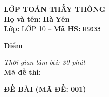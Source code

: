 \noindent
\begin{tcolorbox}[colback=white,colframe=black,arc=0mm,boxrule=0.8pt,top=4pt,bottom=4pt,left=6pt,right=6pt]
	\begin{minipage}[c]{0.44\textwidth}
		{\bfseries\large LỚP TOÁN THẦY THÔNG}\\[3pt]
		\textbf{Họ và tên:} \textbf{\large Hà Yên}\\[3pt]
		\textbf{Lớp:} LỚP 10 \quad -- \quad \textbf{Mã HS:} \texttt{HS033}
	\end{minipage}
	\hfill
	\begin{minipage}[c]{0.22\textwidth}
		\begin{tcolorbox}[colback=white,colframe=black,arc=0mm,boxrule=0.6pt,height=1.8cm,halign=center,valign=top,top=2pt]
			{\bfseries\normalsize Điểm}
		\end{tcolorbox}
	\end{minipage}
	\hfill
	\begin{minipage}[c]{0.30\textwidth}
		\raggedleft
		\textit{Thời gian làm bài: 30 phút}\\[4pt]
		\textbf{Mã đề thi:} 
	\end{minipage}
\end{tcolorbox}
\vspace{0.25cm}

\noindent\textbf{\large ĐỀ BÀI (MÃ ĐỀ: 001)}
\vspace{0.1cm}


